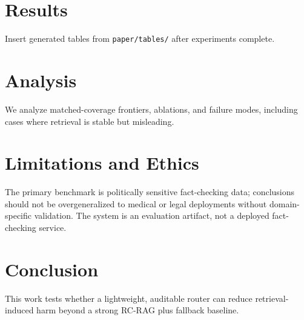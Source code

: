 \documentclass[11pt]{article}
\begin{document}
\section{Results}
Insert generated tables from \texttt{paper/tables/} after experiments complete.

\section{Analysis}
We analyze matched-coverage frontiers, ablations, and failure modes, including cases where retrieval is stable but misleading.

\section{Limitations and Ethics}
The primary benchmark is politically sensitive fact-checking data; conclusions should not be overgeneralized to medical or legal deployments without domain-specific validation.
The system is an evaluation artifact, not a deployed fact-checking service.

\section{Conclusion}
This work tests whether a lightweight, auditable router can reduce retrieval-induced harm beyond a strong RC-RAG plus fallback baseline.



\end{document}
